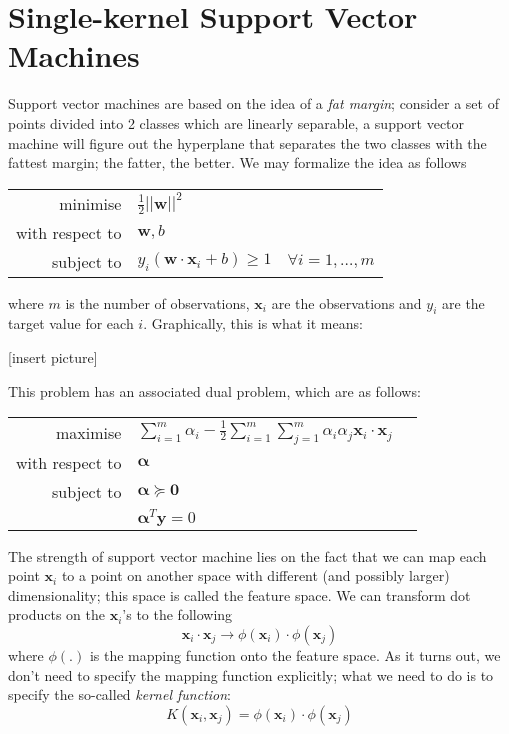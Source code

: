 \documentclass[11pt]{article}%
\def\ds{\displaystyle}
\def\bs{\boldsymbol}
\begin{document}
\section{Single-kernel Support Vector Machines}

Support vector machines are based on the idea of a \textit{fat margin}; consider a set of points divided into 2 classes which are linearly separable, a support vector machine will figure out the hyperplane that separates the two classes with the fattest margin; the fatter, the better. We may formalize the idea as follows

\begin{center}
\begin{tabular}{rll}
minimise & \multicolumn{2}{l}{$\ds \frac12 ||\bs w||^2$} \\
with respect to & \multicolumn{2}{l}{$\bs w, b$} \\
subject to & $y_i(\bs w\cdot \bs x_i+b) \geq 1 $ & $\forall i=1,\ldots,m$
\end{tabular}
\end{center}

where $m$ is the number of observations, $\bs x_i$ are the observations and $y_i$ are the target value for each $i$. Graphically, this is what it means:

[insert picture]

This problem has an associated dual problem, which are as follows:

\begin{center}
\begin{tabular}{rll}
maximise & $\ds \sum_{i=1}^m\alpha_i-\frac12\sum_{i=1}^m\sum_{j=1}^m \alpha_i\alpha_j \bs x_i\cdot \bs x_j$ \\
with respect to & $\bs\alpha$ \\
subject to & $\bs\alpha\succeq\bs 0$ \\
 & $\bs\alpha^T\textbf{y}=0$
\end{tabular}
\end{center}

The strength of support vector machine lies on the fact that we can map each point $\bs x_i$ to a point on another space with different (and possibly larger) dimensionality; this space is called the feature space. We can transform dot products on the $\bs x_i$'s to the following
\[\bs x_i\cdot\bs x_j \rightarrow \phi(\bs x_i)\cdot\phi(\bs x_j)\]
where $\phi(.)$ is the mapping function onto the feature space. As it turns out, we don't need to specify the mapping function explicitly; what we need to do is to specify the so-called \textit{kernel function}:
\[K(\bs x_i, \bs x_j) = \phi(\bs x_i)\cdot\phi(\bs x_j)\]
\end{document}
